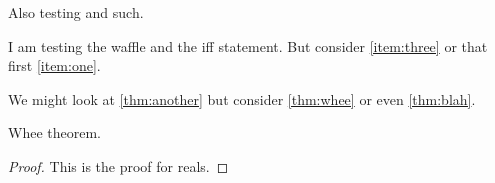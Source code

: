 \documentclass{ximera}
\begin{document}
\begin{problem}
  Also testing  and such.
\end{problem}

I am testing the waffle and the iff statement.  But consider \ref{item:three} or that first \ref{item:one}.


\begin{theorem}
  \label{thm:blah}
\end{theorem}

We might look at \ref{thm:another} but consider \ref{thm:whee} or even \ref{thm:blah}.

\begin{theorem}
  \label{thm:whee}  Whee theorem.
\end{theorem}
\begin{proof}
This is the proof for reals.
\end{proof}
\end{document}
